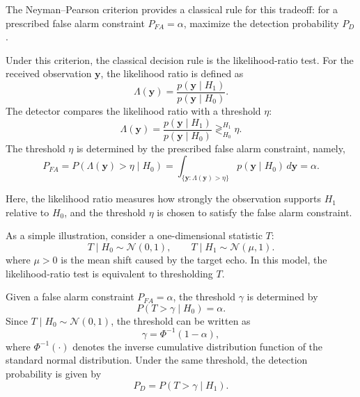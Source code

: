 The Neyman--Pearson criterion provides a classical rule for this tradeoff:
for a prescribed false alarm constraint \(P_{FA}=\alpha\), maximize the
detection probability \(P_D\).

Under this criterion, the classical decision rule is the likelihood-ratio test.
For the received observation \(\mathbf{y}\), the likelihood ratio is defined as
\begin{equation}
    \Lambda(\mathbf{y})
    =
    \frac{p(\mathbf{y}\mid H_1)}
         {p(\mathbf{y}\mid H_0)}.
    \label{eq:likelihood_ratio}
\end{equation}
The detector compares the likelihood ratio with a threshold \(\eta\):
\begin{equation}
    \Lambda(\mathbf{y})
    =
    \frac{p(\mathbf{y}\mid H_1)}
         {p(\mathbf{y}\mid H_0)}
    \mathop{\gtrless}_{H_0}^{H_1}
    \eta.
    \label{eq:np_likelihood_ratio_test}
\end{equation}
The threshold \(\eta\) is determined by the prescribed false alarm constraint,
namely,
\begin{equation}
    P_{FA}
    =
    P\left(\Lambda(\mathbf{y})>\eta\mid H_0\right)
    =
    \int_{\{\mathbf{y}:\Lambda(\mathbf{y})>\eta\}}
    p(\mathbf{y}\mid H_0)\,d\mathbf{y}
    =
    \alpha.
    \label{eq:np_false_alarm_constraint}
\end{equation}

Here, the likelihood ratio measures how strongly the observation supports
\(H_1\) relative to \(H_0\), and the threshold \(\eta\) is chosen to satisfy
the false alarm constraint.

As a simple illustration, consider a one-dimensional statistic \(T\):
\begin{equation}
    T\mid H_0 \sim \mathcal{N}(0,1),
    \qquad
    T\mid H_1 \sim \mathcal{N}(\mu,1).
    \label{eq:np_gaussian_statistic_model}
\end{equation}
where \(\mu>0\) is the mean shift caused by the target echo.
In this model, the likelihood-ratio test is equivalent to thresholding \(T\).

Given a false alarm constraint \(P_{FA}=\alpha\), the threshold \(\gamma\) is
determined by
\begin{equation}
    P(T>\gamma\mid H_0)=\alpha.
    \label{eq:np_threshold_from_pfa}
\end{equation}
Since \(T\mid H_0\sim\mathcal{N}(0,1)\), the threshold can be written as
\begin{equation}
    \gamma=\Phi^{-1}(1-\alpha),
    \label{eq:np_threshold_inverse_cdf}
\end{equation}
where \(\Phi^{-1}(\cdot)\) denotes the inverse cumulative distribution function
of the standard normal distribution.
Under the same threshold, the detection probability is given by
\begin{equation}
    P_D=P(T>\gamma\mid H_1).
    \label{eq:np_pd_from_threshold}
\end{equation}

